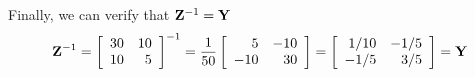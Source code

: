 Finally, we can verify that ${\bf Z}^{-1}={\bf Y}$
\[ {\bf Z}^{-1}=\left[ \begin{array}{rr} 30 & 10 \\ 10 & 5 \end{array} \right]^{-1}
	=\frac{1}{50}\left[ \begin{array}{rr} 5 & -10 \\ -10 & 30 \end{array} \right]
	=\left[ \begin{array}{rr} 1/10 & -1/5 \\ -1/5 & 3/5 \end{array} \right]
	={\bf Y}	\]




	

	










